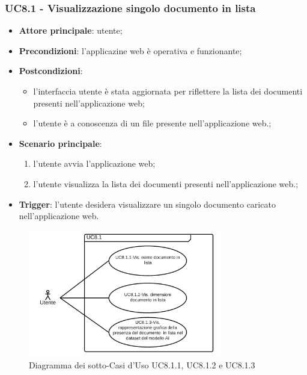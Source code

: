 \documentclass[10pt, a4paper]{article}
\begin{document}
    \subsubsection{UC8.1 - Visualizzazione singolo documento in lista}
    \begin{itemize}
        \item \textbf{Attore principale}: utente;
        \item \textbf{Precondizioni}: l'applicazine web è operativa e funzionante;
        \item \textbf{Postcondizioni}:
        \begin{itemize}
            \item l'interfaccia utente è stata aggiornata per riflettere la lista dei documenti presenti nell'applicazione web;
            \item l'utente è a conoscenza di un file presente nell'applicazione web.;
        \end{itemize}
        \item \textbf{Scenario principale}:
        \begin{enumerate}
            \item l'utente avvia l'applicazione web;
            \item l'utente visualizza la lista dei documenti presenti nell'applicazione web.;
        \end{enumerate}
        \item \textbf{Trigger}: l'utente desidera visualizzare un singolo documento caricato nell'applicazione web.
    \end{itemize}

    \begin{figure}[h]
        \centering
        \includegraphics[width=0.75\textwidth, height=0.75\textheight, keepaspectratio]{UC-images/UC8.1.1-UC8.1.2-UC8.1.3.png}
        \caption{Diagramma dei sotto-Casi d'Uso UC8.1.1, UC8.1.2 e UC8.1.3}
    \end{figure}
    
\end{document}
